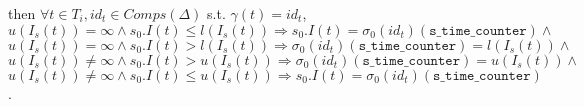 \documentclass[dvipsnames,12pt]{article}
\begin{document}
\begin{lemma}
  \label{lem:init-states-eq-tc}
  \inithyps{} then
  $\forall{}t\in{}T_i,id_t\in{}Comps(\Delta)$ s.t. $\gamma(t)=id_t$,\\
  $u(I_s(t))=\infty\land{}s_0.I(t)\le{}l(I_s(t))\Rightarrow{}s_0.I(t)=\sigma_0(id_t)(\texttt{s\_time\_counter})\land{}$\\
  $u(I_s(t))=\infty\land{}s_0.I(t)>{}l(I_s(t))\Rightarrow{}\sigma_0(id_t)(\texttt{s\_time\_counter})=l(I_s(t))\land{}$\\
  $u(I_s(t))\neq\infty\land{}s_0.I(t)>{}u(I_s(t))\Rightarrow{}\sigma_0(id_t)(\texttt{s\_time\_counter})=u(I_s(t))\land{}$\\
  $u(I_s(t))\neq\infty\land{}s_0.I(t)\le{}u(I_s(t))\Rightarrow{}s_0.I(t)=\sigma_0(id_t)(\texttt{s\_time\_counter})$.
\end{lemma}
\end{document}

